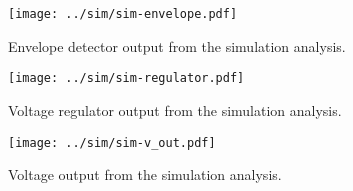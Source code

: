 \begin{figure}[h] \centering
\texttt{[image: ../sim/sim-envelope.pdf]}
\caption{Envelope detector output from the simulation analysis.}
\label{fig:sim-envelope}
\end{figure}

\begin{figure}[h] \centering
\texttt{[image: ../sim/sim-regulator.pdf]}
\caption{Voltage regulator output from the simulation analysis.}
\label{fig:sim-regulator}
\end{figure}

\begin{figure}[h] \centering
\texttt{[image: ../sim/sim-v\_out.pdf]}
\caption{Voltage output from the simulation analysis.}
\label{fig:sim-vout}
\end{figure}
